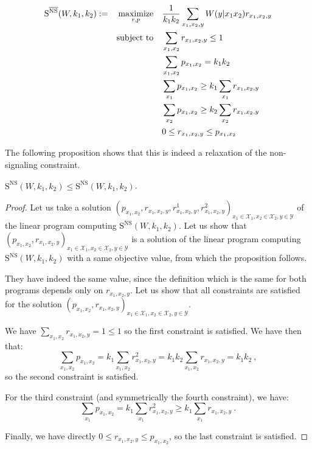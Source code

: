   \begin{definition}
    \begin{equation}
      \begin{aligned}
        \mathrm{S}^{\overline{\mathrm{NS}}}(W,k_1,k_2) := &&\underset{r,p}{\operatorname{\text{maximize}}} &&& \frac{1}{k_1k_2} \sum_{x_1,x_2,y} W(y|x_1x_2)r_{x_1,x_2,y}\\
        &&\operatorname{\text{subject to}} &&& \sum_{x_1,x_2} r_{x_1,x_2,y} \leq 1\\
        &&&&& \sum_{x_1,x_2} p_{x_1,x_2} = k_1k_2\\
        &&&&& \sum_{x_1} p_{x_1,x_2} \geq k_1 \sum_{x_1} r_{x_1,x_2,y}\\
        &&&&& \sum_{x_2} p_{x_1,x_2} \geq k_2 \sum_{x_2} r_{x_1,x_2,y}\\
        &&&&& 0 \leq r_{x_1,x_2,y} \leq p_{x_1,x_2}\\
      \end{aligned}
    \end{equation}
  \end{definition}

The following proposition shows that this is indeed a relaxation of the non-signaling constraint.

  \begin{proposition}
    \label{prop:NSisrelaxed}
   $\mathrm{S}^{\mathrm{NS}}(W,k_1,k_2) \leq \mathrm{S}^{\overline{\mathrm{NS}}}(W,k_1,k_2)$.
  \end{proposition}
  \begin{proof}
    Let us take a solution $(p_{x_1,x_2}, r_{x_1,x_2,y}, r^1_{x_1,x_2,y}, r^2_{x_1,x_2,y})_{x_1 \in \mathcal{X}_1,x_2 \in \mathcal{X}_2,y \in \mathcal{Y}}$ of the linear program computing $\mathrm{S}^{\mathrm{NS}}(W,k_1,k_2)$. Let us show that $(p_{x_1,x_2}, r_{x_1,x_2,y})_{x_1 \in \mathcal{X}_1,x_2 \in \mathcal{X}_2,y \in \mathcal{Y}}$ is a solution of the linear program computing $\mathrm{S}^{\overline{\mathrm{NS}}}(W,k_1,k_2)$ with a same objective value, from which the proposition follows.

    They have indeed the same value, since the definition which is the same for both programs depends only on $r_{x_1,x_2,y}$. Let us show that all constraints are satisfied for the solution $(p_{x_1,x_2}, r_{x_1,x_2,y})_{x_1 \in \mathcal{X}_1,x_2 \in \mathcal{X}_2,y \in \mathcal{Y}}$.

    We have $\sum_{x_1,x_2} r_{x_1,x_2,y} = 1 \leq 1$ so the first constraint is satisfied. We have then that:
    \[\sum_{x_1,x_2} p_{x_1,x_2} = k_1\sum_{x_1,x_2} r^2_{x_1,x_2,y} = k_1k_2\sum_{x_1,x_2} r_{x_1,x_2,y} = k_1k_2 \ ,\]
    so the second constraint is satisfied.

    For the third constraint (and symmetrically the fourth constraint), we have:
    \[\sum_{x_1} p_{x_1,x_2} = k_1\sum_{x_1} r^2_{x_1,x_2,y} \geq  k_1\sum_{x_1} r_{x_1,x_2,y} \ .\]

    Finally, we have directly $0 \leq r_{x_1,x_2,y} \leq p_{x_1,x_2}$, so the last constraint is satisfied.
  \end{proof}

